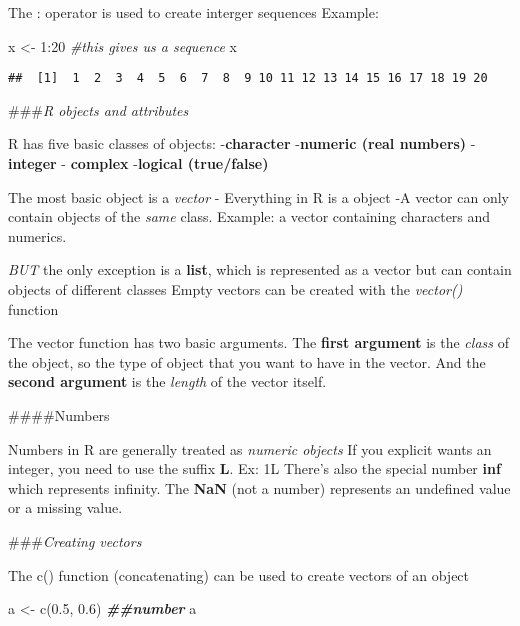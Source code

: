 \documentclass[
]{article}
\newenvironment{Shaded}{\begin{snugshade}}{\end{snugshade}}
\newcommand{\CommentTok}[1]{\textcolor[rgb]{0.56,0.35,0.01}{\textit{#1}}}
\newcommand{\DecValTok}[1]{\textcolor[rgb]{0.00,0.00,0.81}{#1}}
\newcommand{\DocumentationTok}[1]{\textcolor[rgb]{0.56,0.35,0.01}{\textbf{\textit{#1}}}}
\newcommand{\FloatTok}[1]{\textcolor[rgb]{0.00,0.00,0.81}{#1}}
\newcommand{\FunctionTok}[1]{\textcolor[rgb]{0.00,0.00,0.00}{#1}}
\newcommand{\NormalTok}[1]{#1}
\newcommand{\OtherTok}[1]{\textcolor[rgb]{0.56,0.35,0.01}{#1}}
\newcommand{\SpecialCharTok}[1]{\textcolor[rgb]{0.00,0.00,0.00}{#1}}
\begin{document}
The : operator is used to create interger sequences Example:

\begin{Shaded}
\begin{Highlighting}[]
\NormalTok{x }\OtherTok{\textless{}{-}} \DecValTok{1}\SpecialCharTok{:}\DecValTok{20}  \CommentTok{\#this gives us a sequence}
\NormalTok{x}
\end{Highlighting}
\end{Shaded}

\begin{verbatim}
##  [1]  1  2  3  4  5  6  7  8  9 10 11 12 13 14 15 16 17 18 19 20
\end{verbatim}

\#\#\#\emph{R objects and attributes}

R has five basic classes of objects: -\textbf{character}
-\textbf{numeric (real numbers)} -\textbf{integer} - \textbf{complex}
-\textbf{logical (true/false)}

The most basic object is a \emph{vector} - Everything in R is a object
-A vector can only contain objects of the \emph{same} class. Example: a
vector containing characters and numerics.

\emph{BUT} the only exception is a \textbf{list}, which is represented
as a vector but can contain objects of different classes Empty vectors
can be created with the \emph{vector()} function

The vector function has two basic arguments. The \textbf{first argument}
is the \emph{class} of the object, so the type of object that you want
to have in the vector. And the \textbf{second argument} is the
\emph{length} of the vector itself.

\#\#\#\#Numbers

Numbers in R are generally treated as \emph{numeric objects} If you
explicit wants an integer, you need to use the suffix \textbf{L}. Ex: 1L
There's also the special number \textbf{inf} which represents infinity.
The \textbf{NaN} (not a number) represents an undefined value or a
missing value.

\#\#\#\emph{Creating vectors}

The c() function (concatenating) can be used to create vectors of an
object

\begin{Shaded}
\begin{Highlighting}[]
\NormalTok{a }\OtherTok{\textless{}{-}} \FunctionTok{c}\NormalTok{(}\FloatTok{0.5}\NormalTok{, }\FloatTok{0.6}\NormalTok{) }\DocumentationTok{\#\#number}
\NormalTok{a}
\end{Highlighting}
\end{Shaded}
\end{document}
